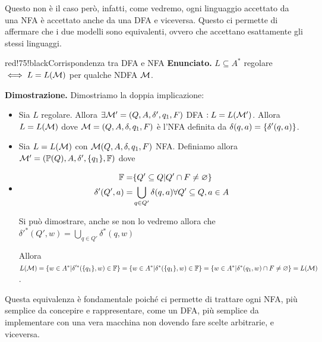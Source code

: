 Questo non è il caso però, infatti, come vedremo, ogni linguaggio accettato da una NFA è accettato anche da una DFA e viceversa. Questo ci permette di affermare che i due modelli sono equivalenti, ovvero che accettano esattamente gli stessi linguaggi.

\begin{halfframedbox}{red!75!black}{Corrispondenza tra DFA e NFA}\label{Corrispondenza tra DFA e NFA}
  \textbf{Enunciato. } \(L\subseteq A^*\) regolare \(\iff L=L(\mathcal{M})\) per qualche NDFA \(\mathcal{M}\).

  \begin{center}
    \textcolor{red!75!black}{\hdashrule[0.5ex]{18cm}{1pt}{3mm 3pt 1mm 2pt}}
  \end{center}

  \textbf{Dimostrazione. } Dimostriamo la doppia implicazione:
  \begin{itemize}
    \item[``\(\Rightarrow\)''] Sia \(L\) regolare. Allora \(\exists \mathcal{M}'=(Q,A,\delta',q_1,F)\) DFA \(: L=L(\mathcal{M}')\). Allora \(L=L(\mathcal{M})\) dove \(\mathcal{M}=(Q,A,\delta,q_1,F)\) è l'NFA definita da \(\delta(q,a)=\displaystyle{\left\{{\delta'(q,a)}\right\}}\).
    \item[``\(\Leftarrow\)''] Sia \(L=L(\mathcal{M})\) con \(\mathcal{M}(Q,A,\delta,q_1,F)\) NFA. Definiamo allora \(\mathcal{M}'=(\mathbb{P}(Q), A, \delta', \displaystyle{\left\{{q_1}\right\}}, \mathbb{F})\) dove %
    \item[]
    \begin{equation}
      \begin{split}
        \mathbb{F} = &\displaystyle{\left\{{Q' \subseteq Q \vert Q' \cap F \neq \varnothing }\right\}}\\
        \delta'(Q',a)=&\bigcup\limits_{q \in Q'} \delta(q,a) \forall Q'\subseteq Q, a \in A
      \end{split}
    \end{equation}

    Si può dimostrare, anche se non lo vedremo allora che \(\delta'^*(Q',w)=\bigcup\limits_{q \in Q'}\delta^*(q,w)\)

    Allora \(L(\mathcal{M})=\displaystyle{\left\{{w \in A^* \vert \delta'^*(\displaystyle{\left\{{q_1}\right\}},w) \in \mathbb{F}}\right\}} = \displaystyle{\left\{{w \in A^* \vert \delta^*(\displaystyle{\left\{{q_1}\right\}},w) \in \mathbb{F}}\right\}} = \displaystyle{\left\{{w \in A^* \vert \delta^*(q_1,w) \cap F \neq \varnothing}\right\}}=L(\mathcal{M})\).

  \end{itemize}
\end{halfframedbox}

Questa equivalenza è fondamentale poiché ci permette di trattare ogni NFA, più semplice da concepire e rappresentare, come un DFA, più semplice da implementare con una vera macchina non dovendo fare scelte arbitrarie, e viceversa.


